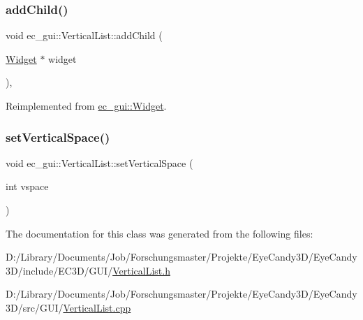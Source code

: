 \subsubsection{\texorpdfstring{add\+Child()}{addChild()}}
{\footnotesize\ttfamily void ec\+\_\+gui\+::\+Vertical\+List\+::add\+Child (\begin{DoxyParamCaption}\item[{\mbox{\hyperlink{classec__gui_1_1_widget}{Widget}} $\ast$}]{widget }\end{DoxyParamCaption})\hspace{0.3cm}{\ttfamily [override]}, {\ttfamily [virtual]}}



Reimplemented from \mbox{\hyperlink{classec__gui_1_1_widget_a089877f93123b630011be58624c5d8cf}{ec\+\_\+gui\+::\+Widget}}.

\mbox{\label{classec__gui_1_1_vertical_list_a34333087e3cf19a9b35ae2f80c635e87}} 
\subsubsection{\texorpdfstring{set\+Vertical\+Space()}{setVerticalSpace()}}
{\footnotesize\ttfamily void ec\+\_\+gui\+::\+Vertical\+List\+::set\+Vertical\+Space (\begin{DoxyParamCaption}\item[{int}]{vspace }\end{DoxyParamCaption})}



The documentation for this class was generated from the following files\+:\begin{DoxyCompactItemize}
\item 
D\+:/\+Library/\+Documents/\+Job/\+Forschungsmaster/\+Projekte/\+Eye\+Candy3\+D/\+Eye\+Candy3\+D/include/\+E\+C3\+D/\+G\+U\+I/\mbox{\hyperlink{_vertical_list_8h}{Vertical\+List.\+h}}\item 
D\+:/\+Library/\+Documents/\+Job/\+Forschungsmaster/\+Projekte/\+Eye\+Candy3\+D/\+Eye\+Candy3\+D/src/\+G\+U\+I/\mbox{\hyperlink{_vertical_list_8cpp}{Vertical\+List.\+cpp}}\end{DoxyCompactItemize}
